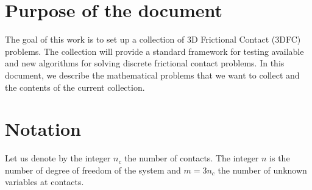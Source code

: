 \documentclass[twoside]{article}
\begin{document}
\makeRT %

\section*{Purpose of the document}



The goal of this work is to set up a collection of 3D Frictional Contact (3DFC) problems. The collection will provide a standard framework for testing available and new algorithms for solving discrete frictional contact problems.  In this document, we describe the mathematical problems that we want to collect and the contents of the current collection.

\section*{Notation}
Let us denote by the integer $n_c$ the number of contacts. The integer $n$ is the number of degree of freedom of the system and $m = 3 n_c$ the number of unknown variables at contacts.
\end{document}
